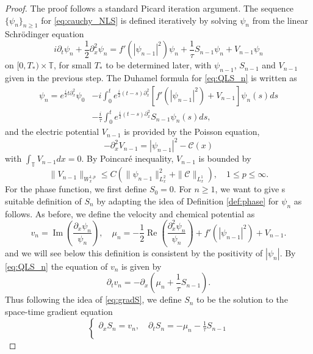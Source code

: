 \documentclass[10pt,a4paper]{amsart}
\DeclareMathOperator{\IM}{Im}
\DeclareMathOperator{\RE}{Re}
\def\T{{\mathbb T}}%
\def\d{{\partial}}
\begin{document}
\begin{proof}
The proof follows a standard Picard iteration argument. The sequence $\{\psi_n\}_{n\geq 1}$ for \eqref{eq:cauchy_NLS} is defined iteratively by solving $\psi_n$ from the linear Schr\"odinger equation 
\begin{equation}\label{eq:QLS_n}
i\d_t\psi_n+\frac12\d_x^2\psi_n=f'(|\psi_{n-1}|^2)\psi_n+\frac{1}{\tau}S_{n-1}\psi_n+V_{n-1}\psi_n
\end{equation}
on $[0,T_*)\times \T$, for small $T_*$ to be determined later, with $\psi_{n-1}$, $S_{n-1}$ and $V_{n-1}$ given in the previous step. The Duhamel formula for \eqref{eq:QLS_n} is written as
\begin{equation}\label{eq:duhamel}
\begin{aligned}
\psi_n=e^{\frac{i}{2}t\d_x^2}\psi_0&-i\int_0^te^{\frac{i}{2}(t-s)\d_x^2}[f'(|\psi_{n-1}|^2)+V_{n-1}]\psi_n(s)ds\\
&-\frac{i}{\tau}\int_0^te^{\frac{i}{2}(t-s)\d_x^2}S_{n-1}\psi_n(s)ds,
\end{aligned}
\end{equation}
and the electric potential $V_{n-1}$ is provided by the Poisson equation, 
\[
-\d_x^2 V_{n-1}=|\psi_{n-1}|^2-\mathcal{C}(x)
\]
with $\int_\T V_{n-1}dx=0$. By Poincar\'e inequality, $V_{n-1}$ is bounded by
\[
\|V_{n-1}\|_{W^{1,p}_x}\leq C(\|\psi_{n-1}\|^2_{L^2_x}+\|\mathcal{C}\|_{L^1_x}),\quad 1\leq p\leq \infty.
\]
For the phase function, we first define $S_0=0$. For $n\geq 1$, we want to give s suitable definition of $S_n$ by adapting the idea of Definition \ref{def:phase} for $\psi_n$ as follows. As before, we define the velocity and chemical potential as
\begin{equation}\label{eq:mu_n}
v_n=\IM\left(\frac{\d_x\psi_n}{\psi_n}\right),\quad \mu_n=-\frac12\RE\left(\frac{\d_x^2\psi_n}{\psi_n}\right)+f'(|\psi_{n-1}|^2)+V_{n-1}.
\end{equation}
and we will see below this definition is consistent by the positivity of $|\psi_n|$. By \eqref{eq:QLS_n} the equation of $v_n$ is given by
\begin{equation}\label{eq:dtv_n}
\d_t v_n=-\d_x\left(\mu_n+\frac{1}{\tau}S_{n-1}\right).
\end{equation}
Thus following the idea of \eqref{eq:gradS}, we define $S_n$ to be the solution to the space-time gradient equation 
\begin{equation}\label{eq:gradS_n}
\begin{cases}
\d_xS_n =v_n,\quad\d_t S_n=-\mu_n-\frac{1}{\tau}S_{n-1} \\

\end{cases}
\end{equation}
\end{proof}
\end{document}
